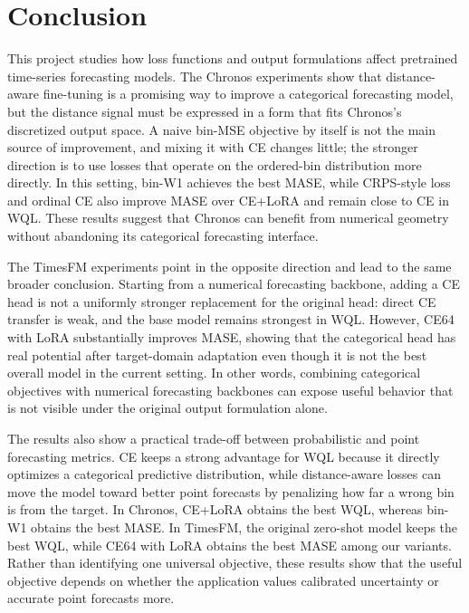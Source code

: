 \documentclass{article}
\begin{document}
\section{Conclusion}

This project studies how loss functions and output formulations affect
pretrained time-series forecasting models.  The Chronos experiments show that
distance-aware fine-tuning is a promising way to improve a categorical
forecasting model, but the distance signal must be expressed in a form that fits
Chronos's discretized output space.  A naive bin-MSE objective by itself is not
the main source of improvement, and mixing it with CE changes little; the
stronger direction is to use losses that operate on the ordered-bin distribution
more directly.  In this setting, bin-W1 achieves the best MASE, while CRPS-style
loss and ordinal CE also improve MASE over CE+LoRA and remain close to CE in
WQL.  These results suggest that Chronos can benefit from numerical geometry
without abandoning its categorical forecasting interface.

The TimesFM experiments point in the opposite direction and lead to the same
broader conclusion.  Starting from a numerical forecasting backbone, adding a CE
head is not a uniformly stronger replacement for the original head: direct CE
transfer is weak, and the base model remains strongest in WQL.  However, CE64
with LoRA substantially improves MASE, showing that the categorical head has
real potential after target-domain adaptation even though it is not the best
overall model in the current setting.  In other words, combining categorical
objectives with numerical forecasting backbones can expose useful behavior that
is not visible under the original output formulation alone.

The results also show a practical trade-off between probabilistic and point
forecasting metrics.  CE keeps a strong advantage for WQL because it directly
optimizes a categorical predictive distribution, while distance-aware losses can
move the model toward better point forecasts by penalizing how far a wrong bin
is from the target.  In Chronos, CE+LoRA obtains the best WQL, whereas bin-W1
obtains the best MASE.  In TimesFM, the original zero-shot model keeps the best
WQL, while CE64 with LoRA obtains the best MASE among our variants.  Rather than
identifying one universal objective, these results show that the useful
objective depends on whether the application values calibrated uncertainty or
accurate point forecasts more.
\end{document}
